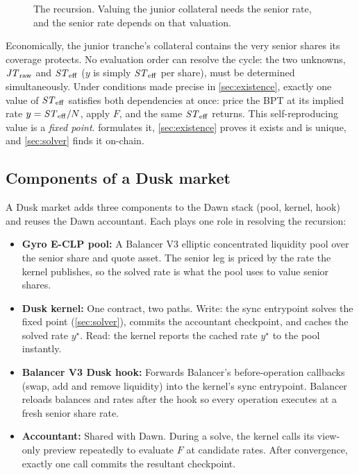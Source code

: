 \begin{figure}[!ht]
\centering
{}
\caption{The recursion. Valuing the junior collateral needs the senior
rate, and the senior rate depends on that valuation.}
\label{fig:recursion}
\end{figure}

Economically, the junior tranche's collateral contains the very senior
shares its coverage protects. No evaluation order can resolve the cycle:
the two unknowns, $\mathit{JT}_{\mathrm{raw}}$ and $\mathit{ST}_{\mathrm{eff}}$ ($y$ is simply $\mathit{ST}_{\mathrm{eff}}$ per
share), must be determined simultaneously. Under conditions made
precise in \cref{sec:existence}, exactly one value of
$\mathit{ST}_{\mathrm{eff}}$ satisfies both dependencies at once: price the BPT at its
implied rate $y = \mathit{ST}_{\mathrm{eff}}/N$, apply $F$, and the same $\mathit{ST}_{\mathrm{eff}}$ returns.
This self-reproducing value is a \emph{fixed point}. 
formulates it, \cref{sec:existence} proves it exists and is unique, and
\cref{sec:solver} finds it on-chain.

\subsection{Components of a Dusk market}
\label{sec:overview:pieces}

A Dusk market adds three components to the Dawn stack (pool, kernel,
hook) and reuses the Dawn accountant. Each plays one role in resolving
the recursion:

\begin{itemize}
  \item \textbf{Gyro E-CLP pool:} A Balancer V3 elliptic concentrated
    liquidity pool over the senior share and quote asset. The senior
    leg is priced by the rate the kernel publishes, so the solved rate
    is what the pool uses to value senior shares.
  \item \textbf{Dusk kernel:} One contract, two paths. Write: the sync
    entrypoint solves the fixed point (\cref{sec:solver}), commits the
    accountant checkpoint, and caches the solved rate $y^\star$. Read:
    the kernel reports the cached rate $y^\star$ to the pool instantly.
  \item \textbf{Balancer V3 Dusk hook:} Forwards Balancer's before-operation
    callbacks (swap, add and remove liquidity) into the kernel's sync
    entrypoint. Balancer reloads balances and rates after the hook so
    every operation executes at a fresh senior share rate.
  \item \textbf{Accountant:} Shared with Dawn. During a solve, the
    kernel calls its view-only preview repeatedly to evaluate $F$ at
    candidate rates. After convergence, exactly one call commits the
    resultant checkpoint.
\end{itemize}
